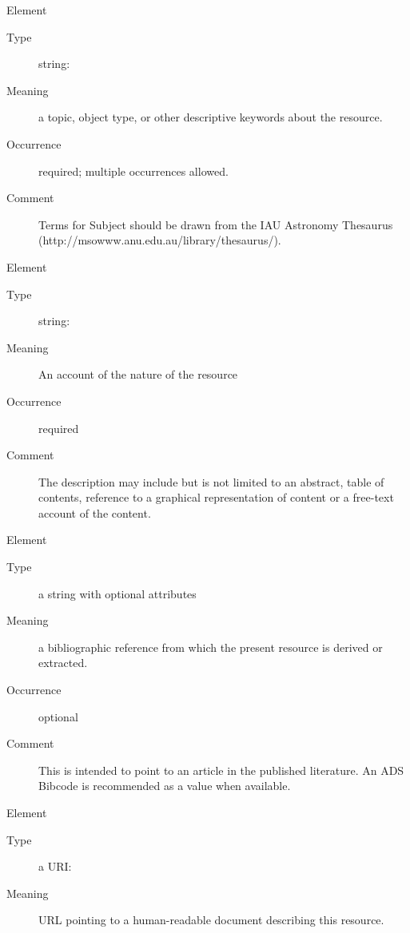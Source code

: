 \documentclass[11pt,a4paper]{ivoa}
\begin{document}
\begingroup\small\begin{bigdescription}\item[Element \xmlel{subject}]
\begin{description}
\item[Type] string: 
\item[Meaning] 
               a topic, object type, or other descriptive keywords 
               about the resource.  
             
\item[Occurrence] required; multiple occurrences allowed.
\item[Comment] 
               Terms for Subject should be drawn from the IAU Astronomy 
               Thesaurus (http://msowww.anu.edu.au/library/thesaurus/).
             

\end{description}
\item[Element \xmlel{description}]
\begin{description}
\item[Type] string: 
\item[Meaning] 
               An account of the nature of the resource
             
\item[Occurrence] required
\item[Comment] 
               The description may include but is not limited to an abstract, 
               table of contents, reference to a graphical representation of
               content or a free-text account of the content.
             

\end{description}
\item[Element \xmlel{source}]
\begin{description}
\item[Type] a string with optional attributes
\item[Meaning] 
                a bibliographic reference from which the present resource is 
                derived or extracted.  
             
\item[Occurrence] optional
\item[Comment] 
                This is intended to point to an article in the published 
                literature.  An ADS Bibcode is recommended as a value when 
                available.    
             

\end{description}
\item[Element \xmlel{referenceURL}]
\begin{description}
\item[Type] a URI: 
\item[Meaning] 
                URL pointing to a human-readable document describing this 
                resource.   
             

\end{description}
\end{bigdescription}
\end{document}
